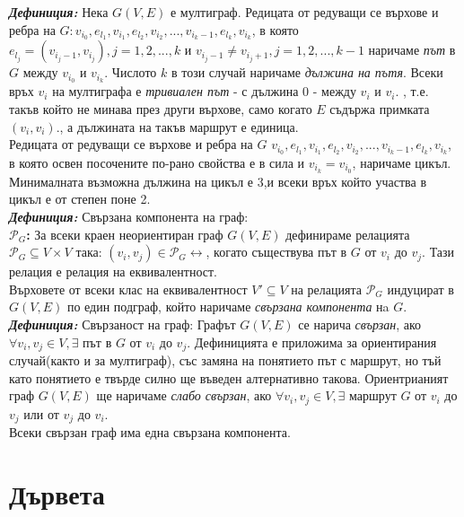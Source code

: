 \documentclass[11pt]{article} %
\newcommand{\italicBold}[1]{\textbf{\emph{#1}}}
\newcommand{\definition}{\italicBold{Дефиниция: }}
\begin{document}
\definition Нека $G(V, E)$ е мултиграф. Редицата от редуващи се върхове и ребра на $G: v_{i_0}, e_{l_1}, v_{i_1}, e_{l_2}, v_{i_2}, ..., v_{i_k-1}, e_{l_k}, v_{i_k}$, в която $e_{l_j} = (v_{i_j-1}, v_{i_j}), j = 1, 2, ..., k$ и $v_{i_j-1} \neq v_{i_j+1}, j = 1, 2, ..., k-1$ наричаме \textit{път} в $G$ между $v_{i_0}$ и $v_{i_k}$. Числото $k$ в този случай наричаме \textit{дължина на пътя}. Всеки връх $v_{i}$ на мултиграфа е \textit{тривиален път} - с дължина 0 - между $v_{i}$ и $v_{i}$. , т.е. такъв който не минава през други върхове, само когато $E$ съдържа примката $(v_{i}, v_{i})$., а дължината на такъв маршрут е единица. \\
Редицата от редуващи се върхове и ребра на $G$ $v_{i_0}, e_{l_1}, v_{i_1}, e_{l_2}, v_{i_2}, ..., v_{i_k-1}, e_{l_k}, v_{i_k}$, в която освен посочените по-рано свойства е в сила и $v_{i_k} = v_{i_0}$, наричаме цикъл. Минималната възможна дължина на цикъл е 3,и всеки връх който участва в цикъл е от степен поне 2. \\

\definition Свързана компонента на граф: \\
\textbf{$\mathcal{P}_{G}$:} За всеки краен неориентиран граф $G(V, E)$ дефинираме релацията $\mathcal{P}_{G} \subseteq V \times V$ така: $(v_{i}, v_{j}) \in \mathcal{P}_{G} \leftrightarrow$, когато съществува път в $G$ от $v_{i}$ до $v_{j}$. Тази релация е релация на еквивалентност.\\ 
Върховете от всеки клас на еквивалентност $V' \subseteq V$ на релацията $\mathcal{P}_{G}$ индуцират в $G(V, E)$ по един подграф, който наричаме \textit{свързана компонента} нa $G$. \\

\definition Свързаност на граф: Графът $G(V, E)$ се нарича \textit{свързан}, ако $\forall v_{i}, v_{j} \in V, \exists$ път в $G$ от $v_{i}$ до $v_{j}$. Дефиницията е приложима за ориентирания случай(както и за мултиграф), със замяна на понятието път с маршрут, но тъй като понятието е твърде силно ще въведен алтернативно такова. Ориентрианият граф $G(V, E)$ ще наричаме \textit{слабо свързан}, ако $\forall v_{i}, v_{j} \in V, \exists$ маршрут $G$ от $v_{i}$ до $v_{j}$ или от $v_{j}$ до $v_{i}$. \\
Всеки свързан граф има една свързана компонента.    

\section{Дървета}
\end{document}
